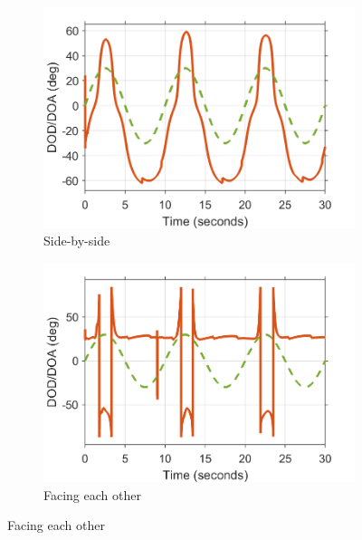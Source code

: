 \documentclass[12pt,a4paper]{report}
\begin{document}
\begin{figure}[h]
    \centering
    \begin{subfigure}{0.45\textwidth}
        \centering
        \includegraphics[width = \textwidth]{Figures/test_doa_sbs.png}
        \caption{Side-by-side}
        \label{fig:test:ue:doa:sbs}
    \end{subfigure}
    \hfill
    \begin{subfigure}{0.45\textwidth}
        \centering
        \includegraphics[width = \textwidth]{Figures/test_doa_fac.png}
        \caption{Facing each other}
        \label{fig:test:ue:doa:fac}
    \end{subfigure}
    

\end{figure}
\end{document}
